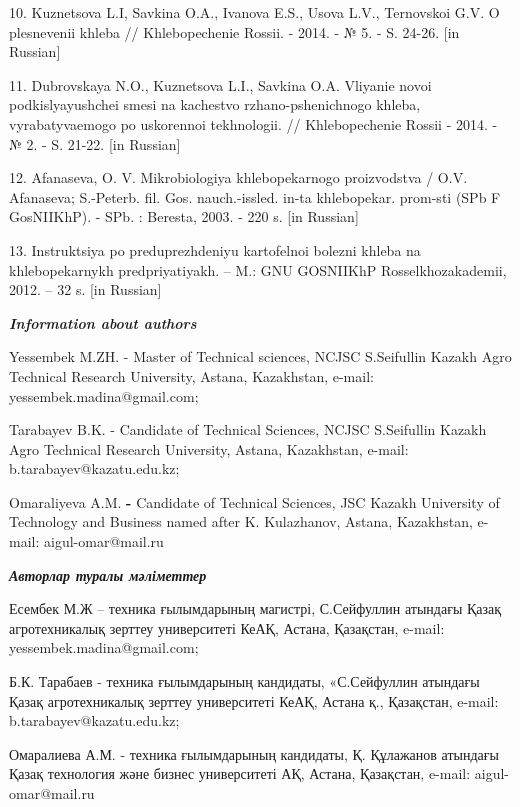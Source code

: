 \begin{noparindent}
10. Kuznetsova L.I, Savkina O.A., Ivanova E.S., Usova L.V., Ternovskoi
G.V. O plesnevenii khleba // Khlebopechenie Rossii. - 2014. - № 5. - S.
24-26. {[}in Russian{]}

11. Dubrovskaya N.O., Kuznetsova L.I., Savkina O.A. Vliyanie novoi
podkislyayushchei smesi na kachestvo rzhano-pshenichnogo khleba,
vyrabatyvaemogo po uskorennoi tekhnologii. // Khlebopechenie Rossii -
2014. - № 2. - S. 21-22. {[}in Russian{]}

12. Afanas\textquotesingle eva, O. V. Mikrobiologiya khlebopekarnogo
proizvodstva / O.V. Afanas\textquotesingle eva; S.-Peterb. fil. Gos.
nauch.-issled. in-ta khlebopekar. prom-sti (SPb F GosNIIKhP). - SPb. :
Beresta, 2003. - 220 s. {[}in Russian{]}

13. Instruktsiya po preduprezhdeniyu kartofel\textquotesingle noi
bolezni khleba na khlebopekarnykh predpriyatiyakh. -- M.: GNU GOSNIIKhP
Rossel\textquotesingle khozakademii, 2012. -- 32 s. {[}in Russian{]}
\end{noparindent}

\emph{{\bfseries Information about authors}}

\begin{noparindent}
Yessembek M.ZH. - Master of Technical sciences, NCJSC S.Seifullin Kazakh
Agro Technical Research University, Astana, Kazakhstan, e-mail:
yessembek.madina@gmail.com;

Tarabayev B.K. - Candidate of Technical Sciences, NCJSC S.Seifullin
Kazakh Agro Technical Research University, Astana, Kazakhstan, e-mail:
b.tarabayev@kazatu.edu.kz;

Omaraliyeva A.M. {\bfseries -} Candidate of Technical Sciences, JSC Kazakh
University of Technology and Business named after K. Kulazhanov, Astana,
Kazakhstan, e-mail: aigul-omar@mail.ru
\end{noparindent}

\emph{{\bfseries Авторлар туралы мәліметтер}}

\begin{noparindent}
Есембек М.Ж -- техника ғылымдарының магистрі, С.Сейфуллин атындағы Қазақ
агротехникалық зерттеу университеті КеАҚ, Астана, Қазақстан, e-mail:
yessembek.madina@gmail.com;

Б.К. Тарабаев - техника ғылымдарының кандидаты, «С.Сейфуллин атындағы
Қазақ агротехникалық зерттеу университеті КеАҚ, Астана қ., Қазақстан,
e-mail: b.tarabayev@kazatu.edu.kz;

Омаралиева А.М. - техника ғылымдарының кандидаты, Қ. Құлажанов атындағы
Қазақ технология және бизнес университеті АҚ, Астана, Қазақстан, e-mail:
aigul-omar@mail.ru
\end{noparindent}
